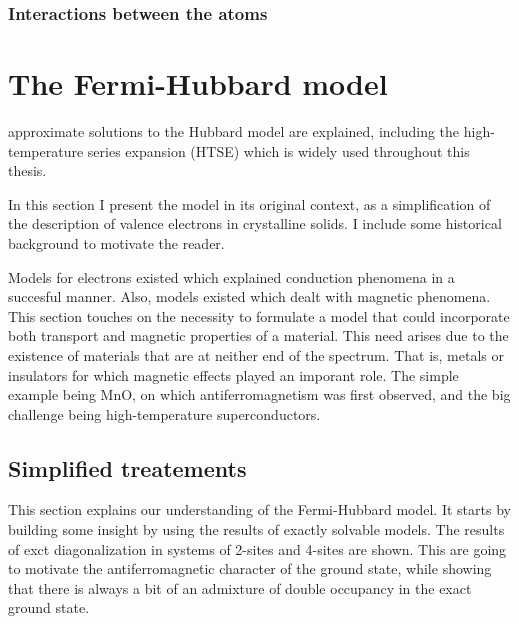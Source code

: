 \documentclass[oneside,11pt]{memoir}
\begin{document}
\subsection{ Interactions between the atoms } 


 
\chapter{The Fermi-Hubbard model}

approximate solutions to the Hubbard model are explained,  including the
high-temperature series expansion (HTSE) which is widely used throughout this
thesis.   


In this section I present the model in its original context, as a
simplification of the description of valence electrons in crystalline solids.
I include some historical background to motivate the reader.  

Models for electrons existed which explained conduction phenomena in a
succesful manner.  Also, models existed which dealt with magnetic phenomena.
This section touches on the necessity to formulate a model that could
incorporate both transport and magnetic properties of a material.   This need
arises due to the existence of materials that are at neither end of the
spectrum.  That is, metals or insulators for which magnetic effects played an
imporant role.   The simple example being MnO, on which antiferromagnetism was
first observed,  and the big challenge being high-temperature
superconductors. 

\section{Simplified treatements}

This section explains our understanding of the Fermi-Hubbard model.  It starts
by building some insight by using the results of exactly solvable models.   The
results of exct diagonalization in systems of 2-sites and 4-sites are shown.
This are going to motivate the antiferromagnetic character of the ground state,
while showing that there is always a bit of an admixture of double occupancy in
the exact ground state.  
\end{document}
